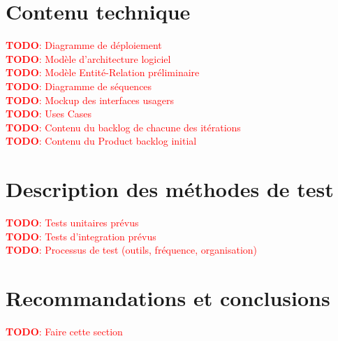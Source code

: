 \documentclass[a11paper, 11pt]{article}
\newcommand{\todo}[1]{\textcolor{red}{\textbf{TODO}: #1}}
\begin{document}
\section{Contenu technique}

\noindent
\todo{Diagramme de déploiement}\\
\todo{Modèle d’architecture logiciel}\\
\todo{Modèle Entité-Relation préliminaire}\\
\todo{Diagramme de séquences}\\
\todo{Mockup des interfaces usagers}\\
\todo{Uses Cases}\\
\todo{Contenu du backlog de chacune des itérations}\\
\todo{Contenu du Product backlog initial}\\

\section{Description des méthodes de test}

\noindent
\todo{Tests unitaires prévus}\\
\todo{Tests d’integration prévus}\\
\todo{Processus de test (outils, fréquence, organisation)}\\

\section{Recommandations et conclusions}

\todo{Faire cette section}\\

\end{document}
